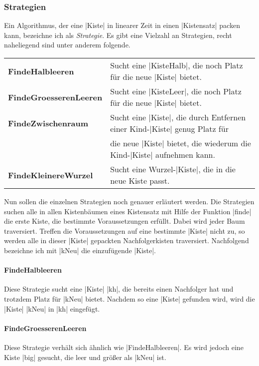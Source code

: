 \subsubsection{Strategien}
\label{strats}
 Ein Algorithmus, der eine |Kiste| in linearer Zeit in einen |Kistensatz| packen kann, bezeichne ich als \emph{Strategie}.
 Es gibt eine Vielzahl an Strategien, recht naheliegend sind unter anderem folgende.

\begin{center}
\begin{tabular}{ll}
 \textbf{FindeHalbleeren}    & Sucht eine |KisteHalb|, die noch Platz für die neue |Kiste| bietet. \\
 \textbf{FindeGroesserenLeeren} & Sucht eine |KisteLeer|, die noch Platz für die neue |Kiste| bietet. \\
 \textbf{FindeZwischenraum}  & Sucht eine |Kiste|, die durch Entfernen einer Kind-|Kiste| genug Platz für \\
                             & die neue |Kiste| bietet, die wiederum die Kind-|Kiste| aufnehmen kann. \\
 \textbf{FindeKleinereWurzel}& Sucht eine Wurzel-|Kiste|, die in die neue Kiste passt.      \\
\end{tabular}
\end{center}

 Nun sollen die einzelnen Strategien noch genauer erläutert werden.
 Die Strategien suchen alle in allen Kistenbäumen eines Kistensatz mit Hilfe der Funktion |finde| die erste Kiste,
  die bestimmte Voraussetzungen erfüllt.
 Dabei wird jeder Baum traversiert. Treffen die Voraussetzungen auf eine bestimmte |Kiste| nicht zu,
  so werden alle in dieser |Kiste| gepackten Nachfolgerkisten traversiert.
 Nachfolgend bezeichne ich mit |kNeu| die einzufügende |Kiste|.
\paragraph{FindeHalbleeren}
 Diese Strategie sucht eine |Kiste| |kh|, die bereits einen Nachfolger hat und trotzdem Platz für |kNeu| bietet.
 Nachdem so eine |Kiste| gefunden wird, wird die |Kiste| |kNeu| in |kh| eingefügt.
\paragraph{FindeGroesserenLeeren}
 Diese Strategie verhält sich ähnlich wie |FindeHalbleeren|. Es wird jedoch eine Kiste |big| gesucht, die leer und größer als |kNeu| ist.
